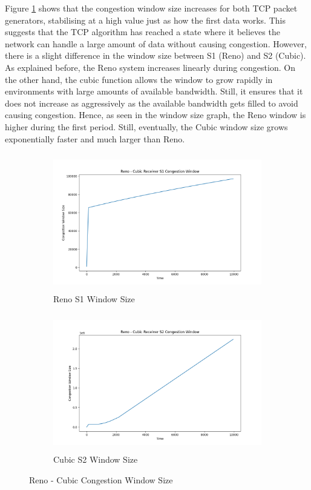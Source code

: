 \documentclass[12pt,a4paper]{report}
\begin{document}
Figure \ref{fig: result_rc_2} shows that the congestion window size increases for both TCP packet generators, stabilising at a high value just as how the first data works. This suggests that the TCP algorithm has reached a state where it believes the network can handle a large amount of data without causing congestion. However, there is a slight difference in the window size between S1 (Reno) and S2 (Cubic). As explained before, the Reno system increases linearly during congestion. On the other hand, the cubic function allows the window to grow rapidly in environments with large amounts of available bandwidth. Still, it ensures that it does not increase as aggressively as the available bandwidth gets filled to avoid causing congestion. Hence, as seen in the window size graph, the Reno window is higher during the first period. Still, eventually, the Cubic window size grows exponentially faster and much larger than Reno. \break \hfill 
\begin{figure}[!ht]
\begin{subfigure}{0.5\textwidth}
\includegraphics[width=1\linewidth, height=6cm]{Pictures/S1_Cubic_Window.png} 
\caption{Reno S1 Window Size}
\end{subfigure}
\begin{subfigure}{0.5\textwidth}
\includegraphics[width=1\linewidth, height=6cm]{Pictures/S2_Cubic_Window.png}
\caption{Cubic S2 Window Size}
\end{subfigure}
\caption{Reno - Cubic Congestion Window Size}
\label{fig: result_rc_2}
\end{figure}
\end{document}
